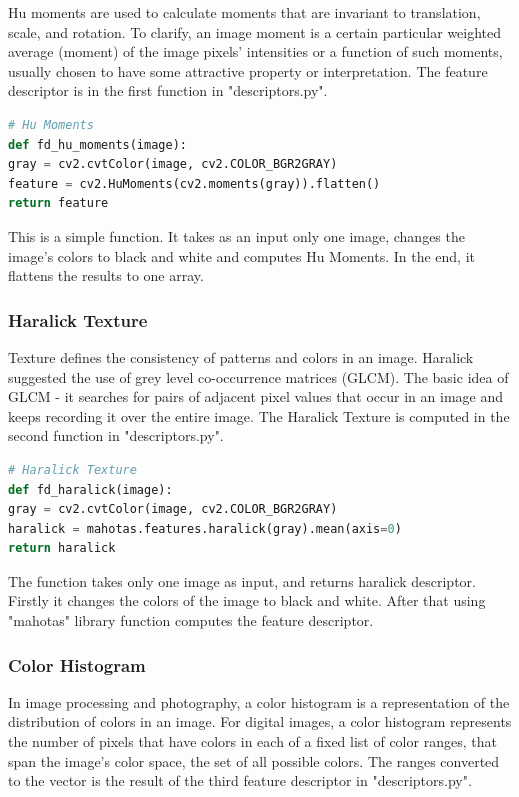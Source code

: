 \documentclass[12pt]{article}
\begin{document}
Hu moments are used to calculate moments that are invariant to translation, scale, and rotation. To clarify, an image moment is a certain particular weighted average (moment) of the image pixels' intensities or a function of such moments, usually chosen to have some attractive property or interpretation. The feature descriptor is in the first function in "descriptors.py".

\begin{lstlisting}[language=Python]
# Hu Moments
def fd_hu_moments(image):
gray = cv2.cvtColor(image, cv2.COLOR_BGR2GRAY)
feature = cv2.HuMoments(cv2.moments(gray)).flatten()
return feature
\end{lstlisting}

This is a simple function. It takes as an input only one image, changes the image's colors to black and white and computes Hu Moments. In the end, it flattens the results to one array.

\subsubsection{Haralick Texture}

Texture defines the consistency of patterns and colors in an image. Haralick suggested the use of grey level co-occurrence matrices (GLCM). The basic idea of GLCM - it searches for pairs of adjacent pixel values that occur in an image and keeps recording it over the entire image. The Haralick Texture is computed in the second function in "descriptors.py".

\begin{lstlisting}[language=Python]
# Haralick Texture
def fd_haralick(image):
gray = cv2.cvtColor(image, cv2.COLOR_BGR2GRAY)
haralick = mahotas.features.haralick(gray).mean(axis=0)
return haralick
\end{lstlisting}

The function takes only one image as input, and returns haralick descriptor. Firstly it changes the colors of the image to black and white. After that using "mahotas" library function computes the feature descriptor.

\subsubsection{Color Histogram}

In image processing and photography, a color histogram is a representation of the distribution of colors in an image. For digital images, a color histogram represents the number of pixels that have colors in each of a fixed list of color ranges, that span the image's color space, the set of all possible colors. The ranges converted to the vector is the result of the third feature descriptor in "descriptors.py".
\end{document}
